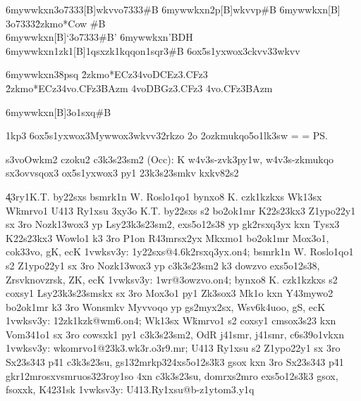 \xo6mywwkxn{\23o7333}[B]{{\2wkvv\3o7333{#B}}}
\xo6mywwkxn{\22p}[B]{{\2wkvv\2p{#B}}}
\xo6mywwkxn{\ovmyno}[B]{\\{\23o7333{\r2zkmo*{Cow} #B}}\\}
\xo6mywwkxn{\psvo}[B]{`\23o7333{#B}'}
\xo6mywwkxn{\ec}{{'BDH}}        %
\xo6mywwkxn{\wk1zk1}[B]{\wk1qsxzk1{\1kqqon1sqr3#B}}
\xo6ox5s1yxwox3{ckvv33}{\2wkvv}{}

\xo6mywwkxn{\owz38psq}{
\r2zkmo*{ECz3}\14vo{DCEz3}{.CFz3}\\
\r2zkmo*{ECz3}\14vo{.CFz3}{BAzm}
\14vo{DBGz3}{.CFz3}
\14vo{.CFz3}{BAzm}}

\xo6mywwkxn{\Occpsq}[B]{\mox3o1sxq{#B}}

\spn1kp3
\xo6ox5s1yxwox3{Mywwox3}{\2wkvv\s32rkzo }{}
%
\ov2o  %
  \42ozkmukqo{5o1lk3sw}
  =
  =
\ps



\3s3vo{Owkm2 czoku2 c3k3s23sm2 (Occ): K w4v3s-zvk3py1w, w4v3s-zkmukqo
sx3ovvsqox3 ox5s1yxwox3 py1 23k3s23smkv kxkv82s2}


\k43ry1{K.T. by22sxs \kxn bsmrk1n W. Roslo1qo1 \kxn bynxo8 K. czk1kzkxs
\kxn Wk13sx W{\"k}mrvo1 \kxn U413 Ry1xsu \pyy3xy3o{%
    K.T. by22sxs s2 bo2ok1mr K22s23kx3 Z1ypo22y1 sx 3ro Nozk13wox3 yp
    Lsy23k3s23sm2, exs5o12s38 yp gk2rsxq3yx kxn Tysx3 K22s23kx3 Wowlo1 k3
    3ro P1on R43mrsx2yx Mkxmo1 bo2ok1mr Mox3o1, cok33vo, gK, ecK
    \41v{wksv3y: 1y22sxs@4.6k2rsxq3yx.on4};
    bsmrk1n W. Roslo1qo1 s2 Z1ypo22y1 sx 3ro Nozk13wox3 yp c3k3s23sm2 k3
    dowzvo exs5o12s38, Zrsvknovzrsk, ZK, ecK \41v{wksv3y: 1wr@3owzvo.on4};
    bynxo8 K. czk1kzkxs s2 coxsy1 Lsy23k3s23smskx sx 3ro Mox3o1 py1 Zk3sox3
    Mk1o kxn Y43mywo2 bo2ok1mr k3 3ro Wonsmkv Myvvoqo yp gs2myx2sx,
    Wsv6k4uoo, gS, ecK \41v{wksv3y: 12zk1kzk@wm6.on4};
    Wk13sx W{\"k}mrvo1 s2 coxsy1 cmsox3s23 kxn Vom341o1 sx 3ro cowsxk1 py1
    c3k3s23sm2, OdR j41smr, j41smr, c6s39o1vkxn
    \41v{wksv3y: wkomrvo1@23k3.wk3r.o3r9.mr};
    U413 Ry1xsu s2 Z1ypo22y1 sx 3ro Sx23s343 p{\"4}1 c3k3s23su,
    gs132mrkp324xs5o12s3{\"k}3 gsox kxn 3ro Sx23s343 p{\"4}1
    gkr12mrosxvsmruos323roy1so 4xn c3k3s23su, domrxs2mro exs5o12s3{\"k}3
    gsox, fsoxxk, K4231sk \41v{wksv3y: U413.Ry1xsu@b-z1ytom3.y1q}}}


